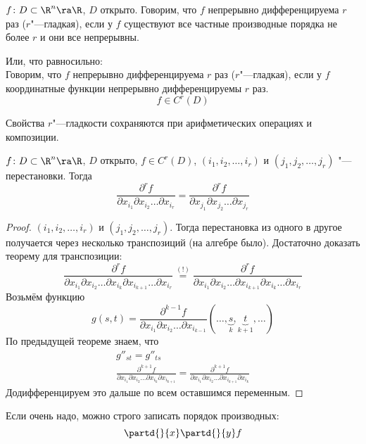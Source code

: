 \begin{Def}
	$f\colon D \subset \R^n \ra \R$, $D$ открыто.
	Говорим, что $f$ непрерывно дифференцируема $r$ раз ($r$"---гладкая), если у $f$ существуют все частные производные порядка не более $r$ и они все непрерывны.

	Или, что равносильно:\\
	Говорим, что $f$ непрерывно дифференцируема $r$ раз ($r$"---гладкая), если у $f$ координатные функции непрерывно дифференцируемы $r$ раз.
	\[ f \in C^r(D) \]
\end{Def}

\begin{Rem}
	Свойства $r$"---гладкости сохраняются при арифметических операциях и композиции.
\end{Rem}

\begin{theorem}
	$f\colon D \subset \R^n \ra \R$, $D$ открыто, $f \in C^r(D)$, $(i_1, i_2, \dots, i_r)$ и $(j_1, j_2, \dots, j_r)$ "--- перестановки.
	Тогда
	\[ \frac{\partial^r f}{\partial x_{i_1} \partial x_{i_2} \dots \partial x_{i_r}} = \frac{\partial^r f}{\partial x_{j_1} \partial x_{j_2} \dots \partial x_{j_r}} \]
\end{theorem}
\begin{proof}
	$(i_1, i_2, \dots, i_r)$ и $(j_1, j_2, \dots, j_r)$. Тогда перестановка из одного в другое получается через несколько транспозиций (на алгебре было). Достаточно доказать теорему для транспозиции:
	\[ \frac{\partial^r f}{\partial x_{i_1} \partial x_{i_2} \dots \partial x_{i_k} \partial x_{i_{k+1}} \dots \partial x_{i_r}}
		\stackrel{(!)}{=} \frac{\partial^r f}{\partial x_{i_1} \partial x_{i_2} \dots \partial x_{i_{k+1}} \partial x_{i_k} \dots \partial x_{i_r}} \]
	Возьмём функцию
	\[ g(s, t) = \frac{\partial^{k-1} f}{\partial x_{i_1} \partial x_{i_2} \dots \partial x_{i_{k-1}}}
		(\dots, \underbrace{s}_{k}, \underbrace{t}_{k+1}, \dots) \]
	По предыдущей теореме знаем, что
	\begin{gather*}
		g''_{st} = g''_{ts} \\
		\frac{\partial^{k+1} f}{\partial x_{i_1} \partial x_{i_2} \dots \partial x_{i_k} \partial x_{i_{k+1}}}
			= \frac{\partial^{k+1} f}{\partial x_{i_1} \partial x_{i_2} \dots \partial x_{i_{k+1}} \partial x_{i_k}}
	\end{gather*}
	Додифференцируем это дальше по всем оставшимся переменным.
\end{proof}
\begin{Rem}
	Если очень надо, можно строго записать порядок производных:
	\[ \partd{}{x} \partd{}{y} f \]
\end{Rem}

